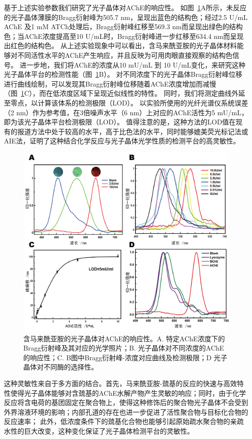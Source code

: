 基于上述实验参数我们研究了光子晶体对AChE的响应性。
如图~\ref{fig:maleimide-enzyme}A所示，未反应的光子晶体薄膜的Bragg衍射峰为505.7 nm，呈现出蓝色的结构色；经过2.5 U/mL AChE 及1 mM ATCh处理后，Bragg衍射峰红移至569.3 nm而呈现出绿色的结构色；当AChE浓度提高至10 U/mL时，Bragg衍射峰进一步红移至634.4 nm而呈现出红色的结构色。
从上述实验现象中可以看出，含马来酰亚胺的光子晶体材料能够对不同活性水平的AChE产生响应，并且反映为可用肉眼直接观察的结构色信号。
进一步地，我们将AChE的浓度从10 mU/mL 到 10 U/mL变化，来研究这种光子晶体平台的检测性能（图~\ref{fig:maleimide-enzyme}B）。
对不同浓度下的光子晶体Bragg衍射峰位移进行曲线绘制，可以发现其Bragg衍射峰位移随着AChE浓度增加而减慢（图~\ref{fig:maleimide-enzyme}C），而在低浓度区域下呈现近似线性的特性。
同时，我们将测定曲线外延至零点，以计算该体系的检测极限（LOD）。
以实验所使用的光纤光谱仪系统误差（2 nm）作为参考值，在3倍噪声水平（6 nm）上对应的AChE活性为5 mU/mL，即为该光子晶体平台检测极限（LOD）。
值得注意的是，这种方法的LOD值在现有的报道方法中处于较高的水平，高于比色法\cite{Li2011Colorimetric}的水平，同时能够媲美荧光标记法\cite{Pavlov2005Inhibition,Feng2007Continuous}或AIE法\cite{Peng2009Fluorescence}，证明了这种结合化学反应与光子晶体光学性质的检测平台的高灵敏性。
\begin{figure}[htbp]
  \centering
  \includegraphics[width=\linewidth]{figures/ch3/enzyme_sensitivity.png}
  \caption{含马来酰亚胺的光子晶体对AChE的响应性。A. 特定AChE浓度下的Bragg衍射峰及其对应的光学照片；B. 光子晶体对不同浓度的AChE的响应性；C. B图中Bragg衍射峰-浓度对应曲线及检测极限；D 光子晶体对不同酶的选择性。}
  \label{fig:maleimide-enzyme}
\end{figure}
这种灵敏性来自于多方面的结合。首先，马来酰亚胺-巯基的反应的快速与高效特性使得光子晶体能够对含巯基的AChE水解产物产生灵敏的响应；同时，由于化学反应将含电荷的基团固定在聚合物上，使得这种修饰后的聚合物光子晶体不会受到外界溶液环境的影响；内部孔道的存在也进一步促进了活性聚合物与目标化合物的反应速率；
此外，低浓度条件下的巯基化合物也能够引起原始疏水聚合物的亲疏水性的巨大改变，这种变化保证了光子晶体检测平台的灵敏性。

